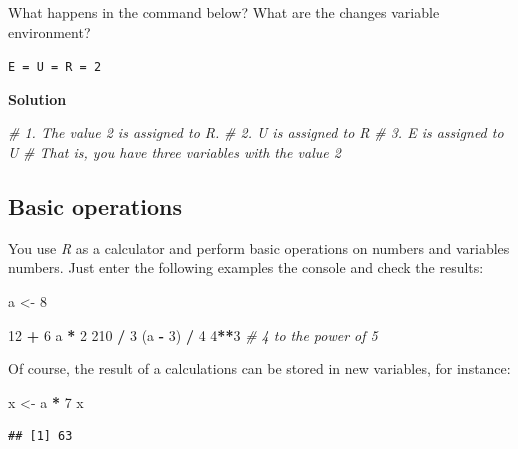 \documentclass[
]{scrartcl}
\makeatletter
\newenvironment{Shaded}{\begin{snugshade}}{\end{snugshade}}
\newcommand{\CommentTok}[1]{\textcolor[rgb]{0.56,0.35,0.01}{\textit{#1}}}
\newcommand{\DecValTok}[1]{\textcolor[rgb]{0.00,0.00,0.81}{#1}}
\newcommand{\NormalTok}[1]{#1}
\newcommand{\OtherTok}[1]{\textcolor[rgb]{0.56,0.35,0.01}{#1}}
\newcommand{\SpecialCharTok}[1]{\textcolor[rgb]{0.81,0.36,0.00}{\textbf{#1}}}
\newenvironment{kframe}{%
\medskip{}
\setlength{\fboxsep}{.8em}
 \def\at@end@of@kframe{}%
 \ifinner\ifhmode%
  \def\at@end@of@kframe{\end{minipage}}%
  \begin{minipage}{\columnwidth}%
 \fi\fi%
 \def\FrameCommand##1{\hskip\@totalleftmargin \hskip-\fboxsep
 \colorbox{shadecolor}{##1}\hskip-\fboxsep
     \hskip-\linewidth \hskip-\@totalleftmargin \hskip\columnwidth}%
 \MakeFramed {\advance\hsize-\width
   \@totalleftmargin\z@ \linewidth\hsize
   \@setminipage}}%
 {\par\unskip\endMakeFramed%
 \at@end@of@kframe}
\newenvironment{rmdblock}[1]
  {
  \begin{itemize}
  \renewcommand{\labelitemi}{
    \raisebox{-.7\height}[0pt][0pt]{
      {\setkeys{Gin}{width=3em,keepaspectratio}\texttt{[image: images/\#1]}}
    }
  }
  \setlength{\fboxsep}{1em}
  \begin{kframe}
  \item
  }
  {
  \end{kframe}
  \end{itemize}
  }
\newenvironment{myexercise}
    {\begin{rmdblock}{exercise_green}}
    {\end{rmdblock}}
\newenvironment{webexsolution}[1]
    {\par\tiny\textbf{#1}}
    {\par}
\newcommand{\webexhide}[1]{\begin{webexsolution}{#1}}
\newcommand{\webexunhide}{\end{webexsolution}}
\makeatother
\begin{document}
\begin{myexercise}
What happens in the command below? What are the changes variable
environment?

\texttt{E\ =\ U\ =\ R\ =\ 2}
\end{myexercise}
\webexhide{Solution}

\begin{Shaded}
\begin{Highlighting}[]
\CommentTok{\# 1. The value 2 is assigned to R.}
\CommentTok{\# 2. U is assigned to R}
\CommentTok{\# 3. E is assigned to U}
\CommentTok{\# That is, you have three variables with the value 2}
\end{Highlighting}
\end{Shaded}

\webexunhide

\subsection{Basic operations}\label{basic-operations}

You use \emph{R} as a calculator and perform basic operations on numbers and variables numbers. Just enter the following examples the console and check the results:

\begin{Shaded}
\begin{Highlighting}[]
\NormalTok{a }\OtherTok{\textless{}{-}} \DecValTok{8}

\DecValTok{12} \SpecialCharTok{+} \DecValTok{6}
\NormalTok{a }\SpecialCharTok{*} \DecValTok{2}
\DecValTok{210} \SpecialCharTok{/} \DecValTok{3}
\NormalTok{(a }\SpecialCharTok{{-}} \DecValTok{3}\NormalTok{) }\SpecialCharTok{/} \DecValTok{4}
\DecValTok{4}\SpecialCharTok{**}\DecValTok{3}     \CommentTok{\# 4 to the power of 5}
\end{Highlighting}
\end{Shaded}

Of course, the result of a calculations can be stored in new variables, for instance:

\begin{Shaded}
\begin{Highlighting}[]
\NormalTok{x }\OtherTok{\textless{}{-}}\NormalTok{ a }\SpecialCharTok{*} \DecValTok{7}
\NormalTok{x}
\end{Highlighting}
\end{Shaded}

\begin{verbatim}
## [1] 63
\end{verbatim}
\end{document}
